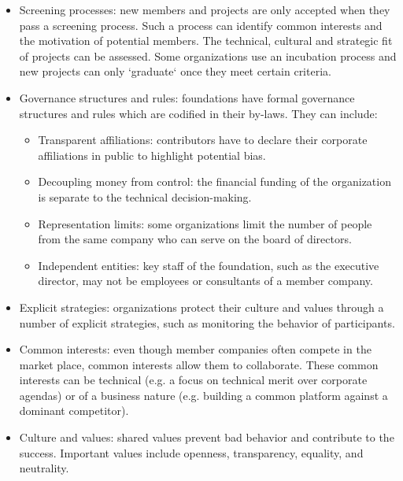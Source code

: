 \begin{itemize}

\item Screening processes: new members and projects are only accepted when they pass a screening process.  Such a process can identify common interests and the motivation of potential members.  The technical, cultural and strategic fit of projects can be assessed.  Some organizations use an incubation process and new projects can only `graduate` once they meet certain criteria.

\item Governance structures and rules: foundations have formal governance structures and rules which are codified in their by-laws.  They can include:

\begin{itemize}

\item Transparent affiliations: contributors have to declare their corporate affiliations in public to highlight potential bias.

\item Decoupling money from control: the financial funding of the organization is separate to the technical decision-making.

\item Representation limits: some organizations limit the number of people from the same company who can serve on the board of directors.

\item Independent entities: key staff of the foundation, such as the executive director, may not be employees or consultants of a member company.

\end{itemize}

\item Explicit strategies: organizations protect their culture and values through a number of explicit strategies, such as monitoring the behavior of participants.

\item Common interests: even though member companies often compete in the market place, common interests allow them to collaborate.  These common interests can be technical (e.g. a focus on technical merit over corporate agendas) or of a business nature (e.g. building a common platform against a dominant competitor).

\item Culture and values: shared values prevent bad behavior and contribute to the success.  Important values include openness, transparency, equality, and neutrality.

\end{itemize}

